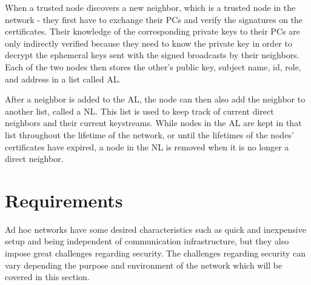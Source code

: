 
When a trusted node discovers a new neighbor, which is a trusted node in the
network - they first have to exchange their \acp{PC} and verify the signatures
on the certificates. Their knowledge of the corresponding private keys to their
\acp{PC} are only indirectly verified because they need to know the private key
in order to decrypt the ephemeral keys sent with the signed broadcasts by their
neighbors. Each of the two nodes then stores the other's public key, subject
name, id, role, and address in a list called \ac{AL}.


After a neighbor is added to the \ac{AL}, the node can then also add the
neighbor to another list, called a \ac{NL}. This list is used to keep
track of current direct neighbors and their current keystreams. While nodes in
the \ac{AL} are kept in that list throughout the lifetime of the network, or
until the lifetimes of the nodes' certificates have expired, a node in the
\ac{NL} is removed when it is no longer a direct neighbor. 

\section{Requirements}
Ad hoc networks have some desired characteristics such as quick and inexpensive
setup and being independent of communication infrastructure, but they also
impose great challenges regarding security. The challenges regarding security
can vary depending the purpose and environment of the network which will be
covered in this section.

